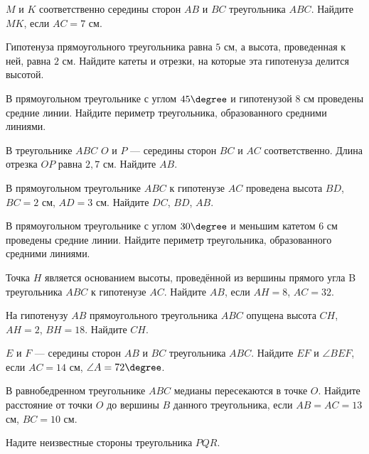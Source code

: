 \begin{class}[number=8]
	\begin{listofex}
		\item \( M \) и \( K \) соответственно середины сторон \( AB \) и \( BC \) треугольника \( ABC \). Найдите \( MK \), если \( AC = 7 \) см.
		\item Гипотенуза прямоугольного треугольника равна \( 5 \) см, а высота, проведенная к ней, равна \( 2 \) см. Найдите катеты и отрезки, на которые эта гипотенуза делится высотой.
		\item В прямоугольном треугольнике с углом \( 45\degree \) и гипотенузой \( 8 \) см проведены средние линии. Найдите периметр треугольника, образованного средними линиями.
		\item В треугольнике \( ABC \) \( O \) и \( P \) --- середины сторон \( BC \) и \( AC \) соответственно. Длина отрезка \( OP \) равна \(  2,7 \) см. Найдите \( AB \).
		\item В прямоугольном треугольнике \( ABC \) к гипотенузе \( AC \) проведена высота \( BD \), \( BC = 2 \) см, \( AD = 3 \) см. Найдите \( DC \), \( BD \), \( AB \).
		\item В прямоугольном треугольнике с углом \( 30\degree \) и меньшим катетом \( 6 \) см проведены средние линии. Найдите периметр треугольника, образованного средними линиями.
		\item Точка \( H \) является основанием высоты, проведённой из вершины прямого угла B треугольника \( ABC \) к гипотенузе \( AC \). Найдите \( AB \), если \( AH = 8 \), \( AC = 32 \).
		\item На гипотенузу \( AB \) прямоугольного треугольника \( ABC \) опущена высота \( CH \), \( AH = 2 \), \( BH = 18 \). Найдите \( CH \).
		\item \( E \) и \( F \) --- середины сторон \( AB \) и \( BC \) треугольника \( ABC \). Найдите \( EF \) и \( \angle BEF \), если \( AC=14 \) см, \( \angle A = 72\degree \).
		\item В равнобедренном треугольнике \( ABC \) медианы пересекаются в точке \( O \). Найдите расстояние от точки \( O \) до вершины \( B \) данного треугольника, если \( AB=AC=13 \) см, \( BC=10 \) см.
		\item 
		\begin{minipage}[t]{\bodywidth}
			Надите неизвестные стороны треугольника \( PQR \).
		\end{minipage}
		\hspace{0.02\linewidth}
		\begin{minipage}[t]{\picwidth}

\end{minipage}
\end{listofex}
\end{class}
